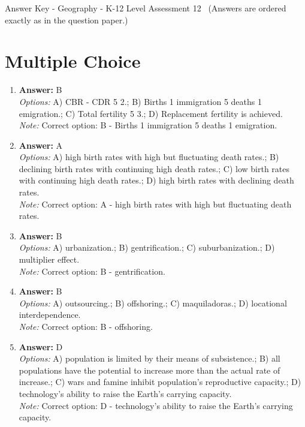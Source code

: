 \documentclass[12pt]{article}
\begin{document}
\begin{center}
Answer Key - Geography - K-12 Level Assessment 12 \
\small (Answers are ordered exactly as in the question paper.)
\end{center}

\section*{Multiple Choice}
\begin{enumerate}[label=\arabic*.]
\item \textbf{Answer:} B
\\ \textit{Options:} A) CBR - CDR 5 2.; B) Births 1 immigration 5 deaths 1 emigration.; C) Total fertility 5 3.; D) Replacement fertility is achieved.
\\ \textit{Note:} Correct option: B - Births 1 immigration 5 deaths 1 emigration.
\item \textbf{Answer:} A
\\ \textit{Options:} A) high birth rates with high but fluctuating death rates.; B) declining birth rates with continuing high death rates.; C) low birth rates with continuing high death rates.; D) high birth rates with declining death rates.
\\ \textit{Note:} Correct option: A - high birth rates with high but fluctuating death rates.
\item \textbf{Answer:} B
\\ \textit{Options:} A) urbanization.; B) gentrification.; C) suburbanization.; D) multiplier effect.
\\ \textit{Note:} Correct option: B - gentrification.
\item \textbf{Answer:} B
\\ \textit{Options:} A) outsourcing.; B) offshoring.; C) maquiladoras.; D) locational interdependence.
\\ \textit{Note:} Correct option: B - offshoring.
\item \textbf{Answer:} D
\\ \textit{Options:} A) population is limited by their means of subsistence.; B) all populations have the potential to increase more than the actual rate of increase.; C) wars and famine inhibit population's reproductive capacity.; D) technology's ability to raise the Earth's carrying capacity.
\\ \textit{Note:} Correct option: D - technology's ability to raise the Earth's carrying capacity.
\end{enumerate}
\end{document}
